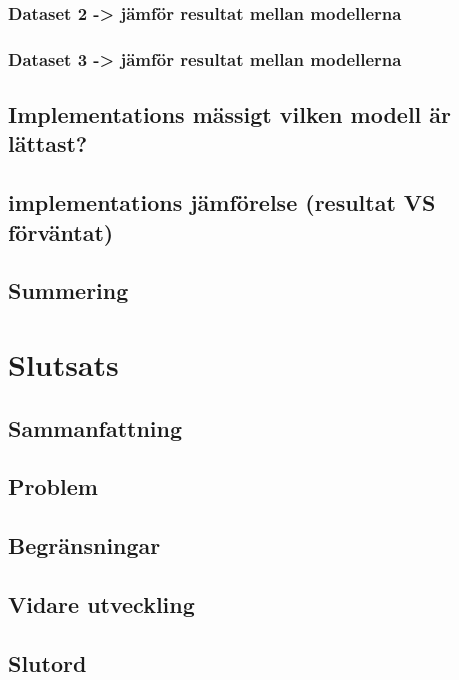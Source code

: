\documentclass{kaumasters} %
\begin{document}
\subsection{Dataset 2 -> jämför resultat mellan modellerna}
\subsection{Dataset 3 -> jämför resultat mellan modellerna}
\newpage
\section{Implementations mässigt vilken modell är lättast?}
\section{implementations jämförelse (resultat VS förväntat)}
\section{Summering}

\chapter{Slutsats}
\section{Sammanfattning}
\section{Problem}
\section{Begränsningar}
\newpage
\section{Vidare utveckling}
\section{Slutord}



 



\restoregeometry%
\end{document}
